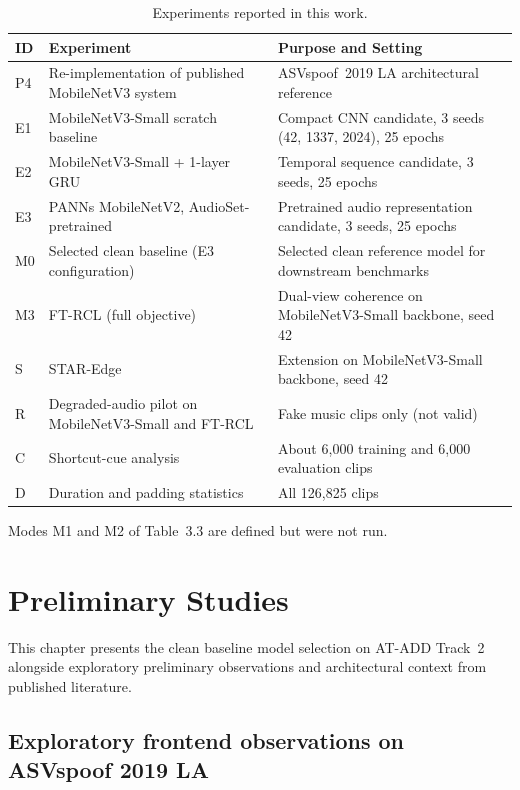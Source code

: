 \documentclass[12pt,a4paper]{report}
\begin{document}
\begin{table}[htbp]
\centering
\caption{Experiments reported in this work.}
\label{tab:catalogue}
\small

\begin{tabular}{@{}p{1.1cm}p{6.3cm}p{6.6cm}@{}}
\toprule
ID & Experiment & Purpose and Setting \\
\midrule
P4 & Re-implementation of published MobileNetV3 system~\cite{pham2024deepfake} & ASVspoof~2019 LA architectural reference \\
\midrule
E1 & MobileNetV3-Small scratch baseline & Compact CNN candidate, 3 seeds (42, 1337, 2024), 25 epochs \\
E2 & MobileNetV3-Small + 1-layer GRU & Temporal sequence candidate, 3 seeds, 25 epochs \\
E3 & PANNs MobileNetV2, AudioSet-pretrained & Pretrained audio representation candidate, 3 seeds, 25 epochs \\
M0 & Selected clean baseline (E3 configuration) & Selected clean reference model for downstream benchmarks \\
\midrule
M3 & FT-RCL (full objective) & Dual-view coherence on MobileNetV3-Small backbone, seed 42 \\
S & STAR-Edge & Extension on MobileNetV3-Small backbone, seed 42 \\
R & Degraded-audio pilot on MobileNetV3-Small and FT-RCL & Fake music clips only (not valid) \\
C & Shortcut-cue analysis & About 6{,}000 training and 6{,}000 evaluation clips \\
D & Duration and padding statistics & All 126{,}825 clips \\
\bottomrule
\end{tabular}

\end{table}

Modes M1 and M2 of Table~3.3 are defined but were not run.

\chapter{Preliminary Studies}
\label{ch:prelim}

This chapter presents the clean baseline model selection on AT-ADD Track~2 alongside exploratory preliminary observations and architectural context from published literature.

\section{Exploratory frontend observations on ASVspoof 2019 LA}
\label{sec:frontend-study}
\end{document}
